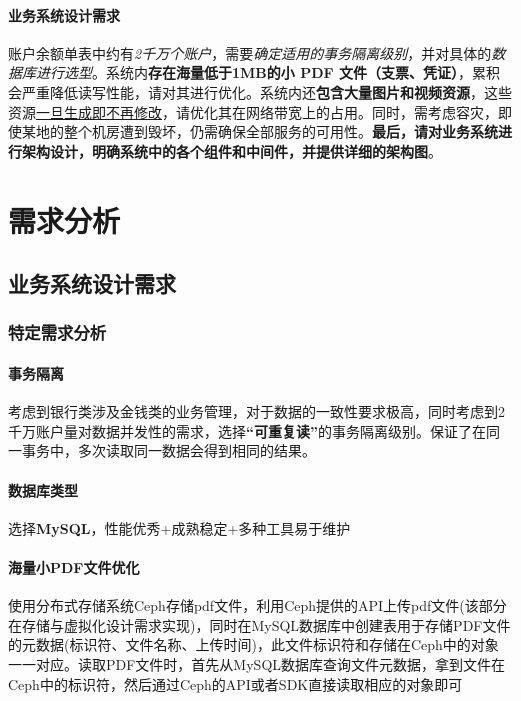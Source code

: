 \documentclass[UTF8]{ctexart} %
\begin{document}
\paragraph{业务系统设计需求} 账户余额单表中约有\emph{2千万个账户}，需要\emph{确定适用的事务隔离级别}，并对具体的\emph{数据库进行选型}。系统内\textbf{存在海量低于1MB的小 PDF 文件（支票、凭证）}，累积会严重降低读写性能，请对其进行优化。系统内还\textbf{包含大量图片和视频资源}，这些资源\underline{一旦生成即不再修改}，请优化其在网络带宽上的占用。同时，需考虑容灾，即使某地的整个机房遭到毁坏，仍需确保全部服务的可用性。\textbf{最后，请对业务系统进行架构设计，明确系统中的各个组件和中间件，并提供详细的架构图}。

\section{需求分析}

\subsection{业务系统设计需求}

\subsubsection{特定需求分析}

\paragraph{事务隔离} 考虑到银行类涉及金钱类的业务管理，对于数据的一致性要求极高，同时考虑到2千万账户量对数据并发性的需求，选择\textbf{“可重复读”}的事务隔离级别。保证了在同一事务中，多次读取同一数据会得到相同的结果。

\paragraph{数据库类型} 选择\textbf{MySQL}，性能优秀+成熟稳定+多种工具易于维护

\paragraph{海量小PDF文件优化} 使用分布式存储系统Ceph存储pdf文件，利用Ceph提供的API上传pdf文件(该部分在存储与虚拟化设计需求实现)，同时在MySQL数据库中创建表用于存储PDF文件的元数据(标识符、文件名称、上传时间)，此文件标识符和存储在Ceph中的对象一一对应。读取PDF文件时，首先从MySQL数据库查询文件元数据，拿到文件在Ceph中的标识符，然后通过Ceph的API或者SDK直接读取相应的对象即可
\end{document}
